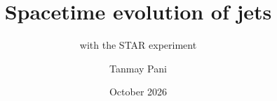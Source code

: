 \documentclass[10pt, aspectratio=169]{beamer}
\title{Spacetime evolution of jets}
\subtitle{with the STAR experiment}
\author{Tanmay Pani}
\institute{Department of Physics and Astronomy, Rutgers University}
\date{October 2026}
\begin{document}
\begin{frame}
	\titlepage
\end{frame}


\end{document}
